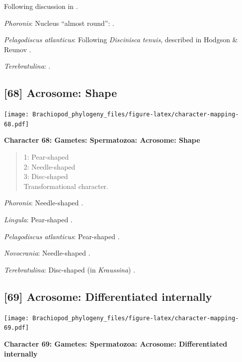 \documentclass[openany]{book}
\theoremstyle{definition}
\theoremstyle{definition}
\theoremstyle{definition}
\theoremstyle{remark}
\begin{document}
Following discussion in \citet{Hodgson1994Ultrastructureof}.

\emph{Phoronis}: Nucleus ``almost round'':
\citet{Reunov2004Ultrastructuralstudy}.

\emph{Pelagodiscus atlanticus}: Following \emph{Discinisca}
\emph{tenuis}, described in Hodgson \& Reunov
\citeyearpar{Hodgson1994Ultrastructureof}.

\emph{Terebratulina}: \citet{Hodgson1994Ultrastructureof}.

\hypertarget{acrosome-shape}{%
\subsection*{{[}68{]} Acrosome: Shape}\label{acrosome-shape}}

\texttt{[image: Brachiopod\_phylogeny\_files/figure-latex/character-mapping-68.pdf]}

\textbf{Character 68: Gametes: Spermatozoa: Acrosome: Shape}

\begin{quote}
1: Pear-shaped\\
2: Needle-shaped\\
3: Disc-shaped\\
Transformational character.
\end{quote}

\emph{Phoronis}: Needle-shaped \citep{Reunov2004Ultrastructuralstudy}.

\emph{Lingula}: Pear-shaped \citep{Fukumoto2003Theacrosome}.

\emph{Pelagodiscus atlanticus}: Pear-shaped
\citep{Hodgson1994Ultrastructureof}.

\emph{Novocrania}: Needle-shaped \citep{Afzelius1978Finestructure}.

\emph{Terebratulina}: Disc-shaped (in \emph{Kraussina})
\citep{Hodgson1994Ultrastructureof}.

\hypertarget{acrosome-differentiated-internally}{%
\subsection*{{[}69{]} Acrosome: Differentiated
internally}\label{acrosome-differentiated-internally}}

\texttt{[image: Brachiopod\_phylogeny\_files/figure-latex/character-mapping-69.pdf]}

\textbf{Character 69: Gametes: Spermatozoa: Acrosome: Differentiated
internally}
\end{document}
